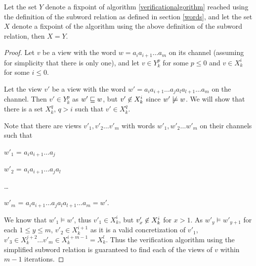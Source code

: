 \begin{lemma}
Let the set $Y$ denote a fixpoint of algorithm \ref{verificationalgorithm} reached using the definition of the subword relation as defined in section \ref{words}, and let the set $X$ denote a fixpoint of the algorithm using the above definition of the subword relation, then $X=Y$.
\end{lemma}
\begin{proof}
Let $v$ be a view with the word $w = a_ia_{i+1}\ldots a_m$ on its channel (assuming for simplicity that there is only one), and let $v\in Y_k^p$ for some $p \leq 0$ and $v\in X_k^i$ for some $i \leq 0$.

Let the view $v'$ be a view with the word $w' = a_ia_{i+1}\ldots a_ja_la_{l+1}\ldots a_m$ on the channel. Then $v' \in Y_k^p$ as $w' \sqsubseteq w$, but $v' \centernot\in X_k^i$ since $w' \centernot\models w$. We will show that there is a set $X_k^q$, $q > i$ such that $v'\in X_k^q$.


Note that there are views $v'_1, v'_2\ldots v'_m$ with words $w'_1, w'_2\ldots w'_m$ on their channels such that

\hspace{10mm}
$w'_1$ =  $a_ia_{i+1}\ldots a_j$

\hspace{10mm}
$w'_2$ = $a_ia_{i+1}\ldots a_ja_l$

\hspace{10mm}
\ldots

\hspace{10mm}
$w'_{m}$ = $a_ia_{i+1}\ldots a_ja_la_{l+1}\ldots a_{m} = w'$.

We know that $w'_1 \models w'$, thus $v'_1 \in X_k^{i}$, but $v'_x \centernot\in X_k^i$ for $x > 1$. As $w'_y \models w'_{y+1}$ for each $1 \leq y \leq m$, $v'_2 \in X_k^{i+1}$ as it is a valid concretization of $v'_1$, $v'_3 \in X_k^{j+2} \ldots v'_m \in X_k^{i+m-1} = X_k^l$. Thus the verification algorithm using the simplified subword relation is guaranteed to find each of the views of $v$ within $m-1$ iterations.

\end{proof}



